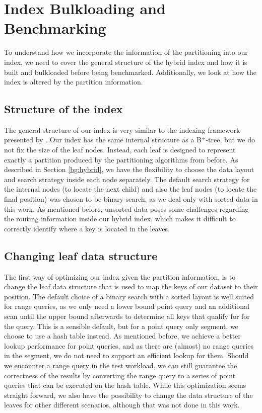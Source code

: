 \section{Index Bulkloading and Benchmarking}
To understand how we incorporate the information of the partitioning into our index, we need to cover the general structure of the hybrid index and how it is built and bulkloaded before being benchmarked. Additionally, we look at how the index is altered by the partition information.
\subsection{Structure of the index}
The general structure of our index is very similar to the indexing framework presented by \citeauthor{Dittrich2021} \cite{Dittrich2021}. Our index has the same internal structure as a B$^+$-tree, but we do not fix the size of the leaf nodes. Instead, each leaf is designed to represent exactly a partition produced by the partitioning algorithms from before. As described in Section \ref{bg:hybrid}, we have the flexibility to choose the data layout and search strategy inside each node separately. The default search strategy for the internal nodes (to locate the next child) and also the leaf nodes (to locate the final position) was chosen to be binary search, as we deal only with sorted data in this work. As mentioned before, unsorted data poses some challenges regarding the routing information inside our hybrid index, which makes it difficult to correctly identify where a key is located in the leaves. 

\subsection{Changing leaf data structure}
The first way of optimizing our index given the partition information, is to change the leaf data structure that is used to map the keys of our dataset to their position. The default choice of a binary search with a sorted layout is well suited for range queries, as we only need a lower bound point query and an additional scan until the upper bound afterwards to determine all keys that qualify for for the query. This is a sensible default, but for a point query only segment, we choose to use a hash table instead. As mentioned before, we achieve a better lookup performance for point queries, and as there are (almost) no range queries in the segment, we do not need to support an efficient lookup for them. Should we encounter a range query in the test workload, we can still guarantee the correctness of the results by converting the range query to a series of point queries that can be executed on the hash table. While this optimization seems straight forward, we also have the possibility to change the data structure of the leaves for other different scenarios, although that was not done in this work.

